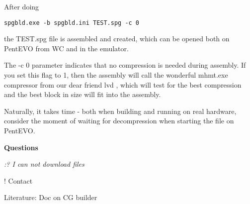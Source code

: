 \documentclass{article}
\begin{document}
After doing
\begin{verbatim}
spgbld.exe -b spgbld.ini TEST.spg -c 0
\end{verbatim}
the TEST.spg file is assembled and created, which can be opened both
on PentEVO from WC and in the emulator.

The -c 0 parameter indicates that no compression is needed during
assembly. If you set this flag to 1, then the assembly will call the
wonderful mhmt.exe compressor from our dear friend lvd , which will
test for the best compression and the best block in size will fit into
the assembly.

Naturally, it takes time - both when building and running on real
hardware, consider the moment of waiting for decompression when
starting the file on PentEVO.

\textbf{Questions}

\emph{:? I can not download files}

! Contact

Literature: Doc on CG builder
\end{document}
